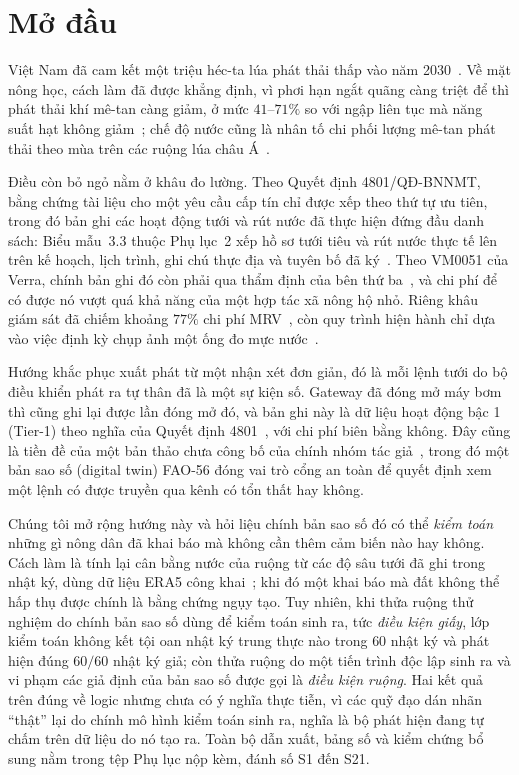 \section{Mở đầu}
\label{sec:intro}

Việt Nam đã cam kết một triệu héc-ta lúa phát thải thấp vào năm 2030~\cite{qd1490}.
Về mặt nông học, cách làm đã được khẳng định, vì phơi hạn ngắt quãng càng triệt
để thì phát thải khí mê-tan càng giảm, ở mức $41$--$71\%$ so với ngập liên tục mà
năng suất hạt không giảm~\cite{balaine2019}; chế độ nước cũng là nhân tố chi
phối lượng mê-tan phát thải theo mùa trên các ruộng lúa châu Á~\cite{yan2005}.

Điều còn bỏ ngỏ nằm ở khâu đo lường. Theo Quyết định 4801/QĐ-BNNMT, bằng chứng tài
liệu cho một yêu cầu cấp tín chỉ được xếp theo thứ tự ưu tiên, trong đó bản ghi các hoạt
động tưới và rút nước đã thực hiện đứng đầu danh sách: Biểu mẫu~3.3 thuộc Phụ lục~2 xếp
hồ sơ tưới tiêu và rút nước thực tế lên trên kế hoạch, lịch trình, ghi chú thực địa và
tuyên bố đã ký~\cite{qd4801}. Theo VM0051 của Verra, chính bản ghi đó còn phải qua thẩm
định của bên thứ ba~\cite{vm0051}, và chi phí để có được nó vượt quá khả năng của một
hợp tác xã nông hộ nhỏ. Riêng khâu giám sát đã chiếm khoảng $77\%$ chi
phí MRV~\cite{jem2026mrv}, còn quy trình hiện hành chỉ dựa vào việc định kỳ chụp ảnh
một ống đo mực nước~\cite{qd4801}.

Hướng khắc phục xuất phát từ một nhận xét đơn giản, đó là mỗi lệnh tưới do bộ điều khiển
phát ra tự thân đã là một sự kiện số. Gateway đã đóng mở máy bơm thì cũng ghi lại được
lần đóng mở đó, và bản ghi này là dữ liệu hoạt động bậc 1 (Tier-1) theo nghĩa của Quyết
định 4801~\cite{qd4801}, với chi phí biên bằng không. Đây cũng là tiền đề của một bản thảo chưa công bố của chính nhóm tác giả~\cite{twingate2026}, trong đó một bản sao số
(digital twin) FAO-56 đóng vai trò cổng an toàn để quyết định xem một lệnh có được truyền
qua kênh có tổn thất hay không.

Chúng tôi mở rộng hướng này và hỏi liệu chính bản sao số đó có thể \emph{kiểm toán}
những gì nông dân đã khai báo mà không cần thêm cảm biến nào hay không. Cách làm là tính
lại cân bằng nước của ruộng từ các độ sâu tưới đã ghi trong nhật ký, dùng dữ liệu ERA5
công khai~\cite{hersbach2020}; khi đó một khai báo mà đất không thể hấp thụ được chính là
bằng chứng ngụy tạo. Tuy nhiên, khi thửa ruộng thử nghiệm do chính bản sao số dùng để
kiểm toán sinh ra, tức \emph{điều kiện giấy}, lớp kiểm toán không kết tội oan nhật ký
trung thực nào trong $60$ nhật ký và phát hiện đúng $60/60$ nhật ký giả; còn thửa ruộng
do một tiến trình độc lập sinh ra và vi phạm các giả định của bản sao số được gọi là
\emph{điều kiện ruộng}. Hai kết quả trên đúng về logic nhưng chưa có ý nghĩa thực tiễn,
vì các quỹ đạo dán nhãn ``thật'' lại do chính mô hình kiểm toán sinh ra, nghĩa là bộ phát
hiện đang tự chấm trên dữ liệu do nó tạo ra. Toàn bộ dẫn xuất, bảng số và kiểm chứng bổ
sung nằm trong tệp Phụ lục nộp kèm, đánh số S1 đến S21.

